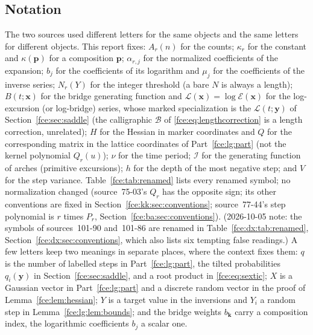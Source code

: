 \documentclass[11pt,a4paper]{article}
\numberwithin{equation}{section}
\theoremstyle{definition}\newtheorem{definition}[theorem]{Definition}
\theoremstyle{remark}\newtheorem{remark}[theorem]{Remark}
\newcommand{\E}{\mathcal E}
\newcommand{\Lcal}{\mathcal L}
\begin{document}
\subsection{Notation}\label{fce:sec:notation}
The two sources used different letters for the same objects and the same
letters for different objects. This report fixes:
$A_r(n)$ for the counts; $\kappa_r$ for the constant and $\kappa(\boldsymbol p)$
for a composition $\boldsymbol p$; $\alpha_{r,j}$ for the normalized
coefficients of the expansion; $b_j$ for the coefficients of its logarithm
and $\mu_j$ for the coefficients of the inverse series; $N_r(Y)$ for the
integer threshold (a bare $N$ is always a length); $B(t;\boldsymbol x)$
for the bridge generating function and
$\Lcal(\boldsymbol x)=\log\E(\boldsymbol x)$ for the log-excursion (or
log-bridge) series, whose marked specialization is the
$\Lcal(t;\boldsymbol y)$ of Section~\ref{fce:sec:saddle} (the calligraphic
$\mathcal B$ of \eqref{fce:eq:lengthcorrection} is a length correction,
unrelated); $H$ for the Hessian in marker coordinates and $Q$ for the
corresponding matrix in the lattice coordinates of Part~\ref{fce:lg:part}
(not the kernel polynomial $Q_r(u)$); $\nu$ for the time period;
$\mathcal I$ for the generating function of arches (primitive excursions);
$h$ for the depth of the most negative step; and $V$ for the step variance.
Table~\ref{fce:tab:renamed} lists every renamed symbol; no normalization
changed (source~75-03's $Q_r$ has the opposite sign; its other conventions
are fixed in Section~\ref{fce:kk:sec:conventions}; source~77-44's step
polynomial is $r$ times $P_r$, Section~\ref{fce:ba:sec:conventions}). (2026-10-05 note: the symbols of sources~101-90 and~101-86 are renamed in
Table~\ref{fce:dx:tab:renamed}, Section~\ref{fce:dx:sec:conventions}, which
also lists six tempting false readings.) A few letters keep two meanings in separate places, where the
context fixes them: $q$ is the number of labelled steps in
Part~\ref{fce:lg:part}, the tilted probabilities $q_i(\boldsymbol y)$ in
Section~\ref{fce:sec:saddle}, and a root product in \eqref{fce:eq:sextic};
$X$ is a Gaussian vector in Part~\ref{fce:lg:part} and a discrete random
vector in the proof of Lemma~\ref{fce:lem:hessian}; $Y$ is a target value
in the inversions and $Y_i$ a random step in
Lemma~\ref{fce:lg:lem:bounds}; and the bridge weights
$b_{\boldsymbol k}$ carry a composition index, the logarithmic
coefficients $b_j$ a scalar one.
\end{document}
